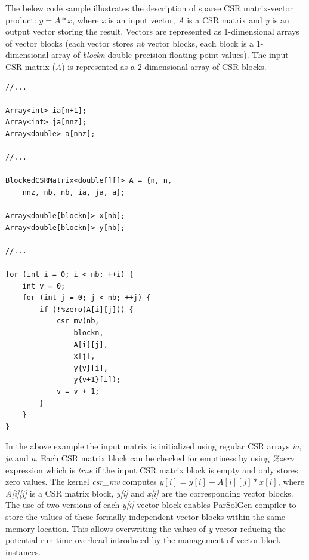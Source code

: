 \documentclass[conference]{IEEEtran}
\begin{document}
The below code sample illustrates the description of sparse CSR matrix-vector product: \(y = A*x\), where 
\textit{x} is an input vector, \textit{A} is a CSR matrix and \textit{y} is an output vector storing the result. 
Vectors are represented as 1-dimensional arrays of vector blocks (each vector stores \textit{nb} vector blocks, each 
block is a 1-dimensional array of \textit{blockn} double precision floating point values). The input CSR matrix 
(\textit{A}) is represented as a 2-dimensional array of CSR blocks.
\begin{lstlisting}[frame=single]
//...

Array<int> ia[n+1];
Array<int> ja[nnz];
Array<double> a[nnz];

//...

BlockedCSRMatrix<double[][]> A = {n, n, 
	nnz, nb, nb, ia, ja, a};

Array<double[blockn]> x[nb];
Array<double[blockn]> y[nb];

//...

for (int i = 0; i < nb; ++i) {
	int v = 0;
	for (int j = 0; j < nb; ++j) {
		if (!%zero(A[i][j])) {
			csr_mv(nb, 
				blockn, 
				A[i][j], 
				x[j], 
				y{v}[i], 
				y{v+1}[i]);
			v = v + 1;
		}
	}
}
\end{lstlisting}
In the above example the input matrix is initialized using regular CSR arrays \textit{ia}, \textit{ja} and 
\textit{a}. Each CSR matrix block can be checked for emptiness by using \textit{\%zero} expression which is 
\textit{true} if the input CSR matrix block is empty and only stores zero values. The kernel \textit{csr\_mv} 
computes \( y[i] = y[i] + A[i][j] * x[i] \), where \textit{A[i][j]} is a CSR matrix block, 
\textit{y[i]} and \textit{x[i]} are the corresponding vector blocks. The use of two versions of each \textit{y[i]} vector 
block enables ParSolGen compiler to store the values of these formally independent vector blocks within the same 
memory location. This allows overwriting the values of \textit{y} vector reducing the potential run-time overhead 
introduced by the management of vector block instances.
\end{document}
